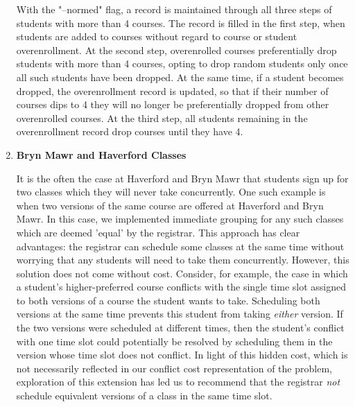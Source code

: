 \documentclass[11pt, oneside]{article}   	%
\begin{document}
\begin{enumerate}
With the "--normed" flag, a record is maintained through all three steps of students with more than 4 courses. The record is filled in the first step, when students are added to courses without regard to course or student overenrollment. At the second step, overenrolled courses preferentially drop students with more than 4 courses, opting to drop random students only once all such students have been dropped. At the same time, if a student becomes dropped, the overenrollment record is updated, so that if their number of courses dips to 4 they will no longer be preferentially dropped from other overenrolled courses. At the third step, all students remaining in the overenrollment record drop courses until they have 4.

\item{\textbf{Bryn Mawr and Haverford Classes}}

It is the often the case at Haverford and Bryn Mawr that students sign up for two classes which they will never take concurrently. One such example is when two versions of the same course are offered at Haverford and Bryn Mawr. In this case, we implemented immediate grouping for any such classes which are deemed 'equal' by the registrar. This approach has clear advantages: the registrar can schedule some classes at the same time without worrying that any students will need to take them concurrently. However, this solution does not come without cost. Consider, for example, the case in which a student's higher-preferred course conflicts with the single time slot assigned to both versions of a course the student wants to take. Scheduling both versions at the same time prevents this student from taking \textit{either} version. If the two versions were scheduled at different times, then the student's conflict with one time slot could potentially be resolved by scheduling them in the version whose time slot does not conflict. In light of this hidden cost, which is not necessarily reflected in our conflict cost representation of the problem, exploration of this extension has led us to recommend that the registrar \textit{not} schedule equivalent versions of a class in the same time slot.

\end{enumerate}
\end{document}
